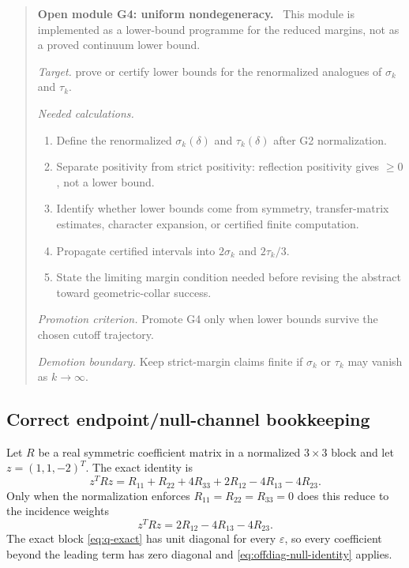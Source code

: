 \documentclass[11pt]{article}
\newcommand{\eps}{\varepsilon}
\newenvironment{openmodule}[1]
{\begin{quote}\color{red!55!black}\textbf{Open module #1.}\ }
{\end{quote}}
\begin{document}
\begin{openmodule}{G4: uniform nondegeneracy}
This module is implemented as a lower-bound programme for the reduced margins, not as a proved continuum lower bound.

\emph{Target.} prove or certify lower bounds for the renormalized analogues of \(\sigma_k\) and \(\tau_k\).

\emph{Needed calculations.}
\begin{enumerate}[label=(\alph*)]
  \item Define the renormalized \(\sigma_k(\delta)\) and \(\tau_k(\delta)\) after G2 normalization.
  \item Separate positivity from strict positivity: reflection positivity gives \(\ge0\), not a lower bound.
  \item Identify whether lower bounds come from symmetry, transfer-matrix estimates, character expansion, or certified finite computation.
  \item Propagate certified intervals into \(2\sigma_k\) and \(2\tau_k/3\).
  \item State the limiting margin condition needed before revising the abstract toward geometric-collar success.
\end{enumerate}

\emph{Promotion criterion.} Promote G4 only when lower bounds survive the chosen cutoff trajectory.

\emph{Demotion boundary.} Keep strict-margin claims finite if \(\sigma_k\) or \(\tau_k\) may vanish as \(k\to\infty\).
\end{openmodule}

\subsection{Correct endpoint/null-channel bookkeeping}

Let $R$ be a real symmetric coefficient matrix in a normalized $3\times3$ block and let $z=(1,1,-2)^T$.  The exact identity is
\begin{equation}
  z^TRz
  =R_{11}+R_{22}+4R_{33}
  +2R_{12}-4R_{13}-4R_{23}.
  \label{eq:full-null-identity}
\end{equation}
Only when the normalization enforces $R_{11}=R_{22}=R_{33}=0$ does this reduce to the incidence weights
\begin{equation}
  z^TRz=2R_{12}-4R_{13}-4R_{23}.
  \label{eq:offdiag-null-identity}
\end{equation}
The exact block \eqref{eq:q-exact} has unit diagonal for every $\eps$, so every coefficient beyond the leading term has zero diagonal and \eqref{eq:offdiag-null-identity} applies.
\end{document}
